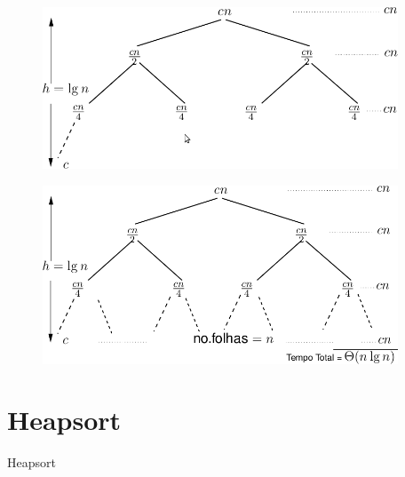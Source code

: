 \documentclass[aspectratio=169]{beamer}
\begin{document}

\begin{frame}
\begin{figure}[!h]
  \centering
  \includegraphics[width=300pt]{imgs/arvore_mergesort2.png}
  \label{fig_arvore_mergesort2}
\end{figure}
\end{frame}


\begin{frame}
\begin{figure}[!h]
  \centering
  \includegraphics[width=300pt]{imgs/arvore_mergesort3.png}
  \label{fig_arvore_mergesort3}
\end{figure}
\end{frame}


\section{Heapsort}

\begin{frame}
\Huge{\centerline{Heapsort}}
\end{frame}

\end{document}
